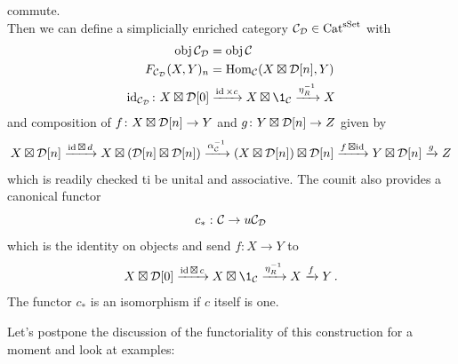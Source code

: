         commute.\\
        Then we can define a simplicially enriched category $\mathcal{C}_{\mathcal{D}} \in \operatorname{Cat}^{\operatorname{sSet}}$ with
        \begin{align*}
            \obj \Cc_{\Dd} &= \obj \Cc \\
            F_{\Cc_{\Dd}}(X, Y)_n &= \Hom_{\Cc}(X \boxtimes \Dd[n], Y) \\
            \id_{\Cc_{\Dd}} \colon X \boxtimes \Dd[0] &\xrightarrow{\id \times c} X \boxtimes \1_{\Cc} \xrightarrow{\eta^{-1}_R} X
        \end{align*}
        and composition of $f \colon X \boxtimes \mathcal{D}[n] \to Y$ and $g \colon Y \boxtimes \mathcal{D}[n] \to Z$ given by
        \begin{equation*}
            X \boxtimes \mathcal{D}[n] \xrightarrow{\operatorname{id} \boxtimes \, d} X \boxtimes (\mathcal{D}[n] \boxtimes \mathcal{D}[n]) \xrightarrow{\alpha^{-1}_{\mathcal{C}}} (X \boxtimes \mathcal{D}[n]) \boxtimes \mathcal{D}[n] \xrightarrow{f \, \boxtimes \operatorname{id}} Y \boxtimes \mathcal{D}[n] \xrightarrow{g} Z
        \end{equation*}
        which is readily checked ti be unital and associative. The counit also provides a canonical functor
        \begin{equation*}
            c_{*} \,\colon \mathcal{C} \to u \mathcal{C}_{\mathcal{D}}
        \end{equation*}
        which is the identity on objects and send $f \colon X \to Y$ to
        \begin{equation*}
            X \boxtimes \Dd[0] \xrightarrow{\id \boxtimes \, c} X \boxtimes \1_{\Cc} \xrightarrow{\eta^{-1}_R} X \xrightarrow{f} Y \,.
        \end{equation*}
        The functor $c_{*}$ is an isomorphism if $c$ itself is one.
        \medskip

        Let's postpone the discussion of the functoriality of this construction for a moment and look at examples:

